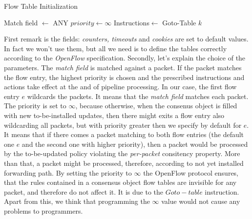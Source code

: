 \documentclass{article}
\begin{document}
\begin{algorithm}
  \caption{Flow Table Initialization}\label{FTInit}
  \begin{algorithmic}[1]
        \State Match field $\gets$ ANY
        \State $priority\gets\infty$
        \State Instructions$\gets$ Goto-Table $k$
      \EndFor
  \end{algorithmic}
\end{algorithm}
First remark is the fields: \emph{counters, timeouts} and \emph{cookies} are set to default values. In fact we won't use them, but all we need is to define the tables correctly according to the \emph{OpenFlow} specification. Secondly, let's explain the choice of the parameters. The \emph{match field} is matched against a packet. If the packet matches the flow entry, the highest priority is chosen and the prescribed instructions and actions take effect at the and of pipeline processing. In our case, the first flow entry $e$ wildcards the packets. It means that the \emph{match field} matches each packet. The priority is set to $\infty$, because otherwise, when the consenus object is filled with new to-be-installed updates, then there might exits a flow entry also wildcarding all packets, but with priority greater then we specify by default for $e$. It means that if there comes a packet matching to both flow entries (the default one $e$ and the second one with higher priority), then a packet would be processed by the to-be-updated policy violating the \emph{per-packet} consitency property. More than that, a packet might be processed, therefore, according to not yet installed forwarding path.
By setting the priority to $\infty$ the OpenFlow protocol ensures, that the rules contained in a consensus object flow tables are invisible for any packet, and therefore do not affect it. It is due to the $Goto-table$ instruction.
Apart from this, we think that programming the $\infty$ value would not cause any problems to programmers. 
\end{document}
